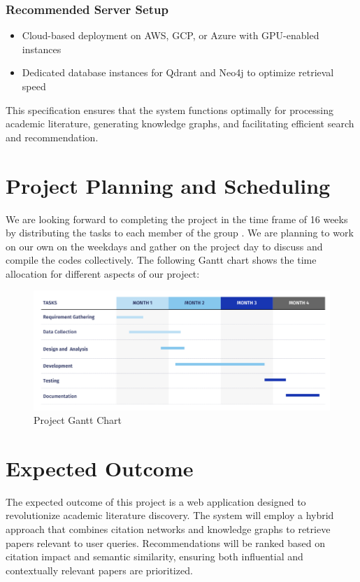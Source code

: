 \documentclass[a4paper,12pt]{article}
\begin{document}
\subsubsection{Recommended Server Setup}
\begin{itemize}
    \item Cloud-based deployment on AWS, GCP, or Azure with GPU-enabled instances
    \vspace{-10pt}
    \item Dedicated database instances for Qdrant and Neo4j to optimize retrieval speed
\end{itemize}
This specification ensures that the system functions optimally for processing academic
literature, generating knowledge graphs, and facilitating efficient search and
recommendation.
\newpage

\section{Project Planning and Scheduling}
We are looking forward to completing the project in the time frame of 16 weeks by
distributing the tasks to each member of the group . We are planning to work on our own
on the weekdays and gather on the project day to discuss and compile the codes
collectively. The following Gantt chart shows the time allocation for different aspects of
our project:
\begin{figure}[H]
    \centering
    \includegraphics[width=15cm]{ganttchart.png}
    \caption{Project Gantt Chart}
\end{figure}
\newpage

\section{Expected Outcome}
The expected outcome of this project is a web application designed to revolutionize
academic literature discovery. The system will employ a hybrid approach that combines
citation networks and knowledge graphs to retrieve papers relevant to user queries.
Recommendations will be ranked based on citation impact and semantic similarity,
ensuring both influential and contextually relevant papers are prioritized.
\end{document}

